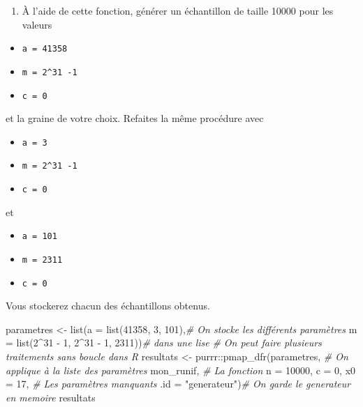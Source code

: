 \documentclass[
]{article}
\newenvironment{Shaded}{\begin{snugshade}}{\end{snugshade}}
\newcommand{\AttributeTok}[1]{\textcolor[rgb]{0.77,0.63,0.00}{#1}}
\newcommand{\CommentTok}[1]{\textcolor[rgb]{0.56,0.35,0.01}{\textit{#1}}}
\newcommand{\DecValTok}[1]{\textcolor[rgb]{0.00,0.00,0.81}{#1}}
\newcommand{\FunctionTok}[1]{\textcolor[rgb]{0.00,0.00,0.00}{#1}}
\newcommand{\NormalTok}[1]{#1}
\newcommand{\OtherTok}[1]{\textcolor[rgb]{0.56,0.35,0.01}{#1}}
\newcommand{\SpecialCharTok}[1]{\textcolor[rgb]{0.00,0.00,0.00}{#1}}
\newcommand{\StringTok}[1]{\textcolor[rgb]{0.31,0.60,0.02}{#1}}
\providecommand{\tightlist}{%
  \setlength{\itemsep}{0pt}\setlength{\parskip}{0pt}}
\begin{document}
\begin{enumerate}
\def\labelenumi{\arabic{enumi}.}
\setcounter{enumi}{1}
\tightlist
\item
  À l'aide de cette fonction, générer un échantillon de taille 10000
  pour les valeurs
\end{enumerate}

\begin{itemize}
\tightlist
\item
  \texttt{a\ =\ 41358}
\item
  \texttt{m\ =\ 2\^{}31\ -1}
\item
  \texttt{c\ =\ 0}
\end{itemize}

et la graine de votre choix. Refaites la même procédure avec

\begin{itemize}
\tightlist
\item
  \texttt{a\ =\ 3}
\item
  \texttt{m\ =\ 2\^{}31\ -1}
\item
  \texttt{c\ =\ 0}
\end{itemize}

et

\begin{itemize}
\tightlist
\item
  \texttt{a\ =\ 101}
\item
  \texttt{m\ =\ 2311}
\item
  \texttt{c\ =\ 0}
\end{itemize}

Vous stockerez chacun des échantillons obtenus.

\begin{Shaded}
\begin{Highlighting}[]
\NormalTok{parametres }\OtherTok{\textless{}{-}} \FunctionTok{list}\NormalTok{(}\AttributeTok{a =} \FunctionTok{list}\NormalTok{(}\DecValTok{41358}\NormalTok{, }\DecValTok{3}\NormalTok{, }\DecValTok{101}\NormalTok{),}\CommentTok{\# On stocke les différents paramètres}
                   \AttributeTok{m =} \FunctionTok{list}\NormalTok{(}\DecValTok{2}\SpecialCharTok{\^{}}\DecValTok{31} \SpecialCharTok{{-}} \DecValTok{1}\NormalTok{, }\DecValTok{2}\SpecialCharTok{\^{}}\DecValTok{31} \SpecialCharTok{{-}} \DecValTok{1}\NormalTok{, }\DecValTok{2311}\NormalTok{))}\CommentTok{\# dans une lise}
\CommentTok{\# On peut faire plusieurs traitements sans boucle dans R}
\NormalTok{resultats }\OtherTok{\textless{}{-}}\NormalTok{ purrr}\SpecialCharTok{::}\FunctionTok{pmap\_dfr}\NormalTok{(parametres, }\CommentTok{\# On applique à la liste des paramètres}
\NormalTok{                             mon\_runif, }\CommentTok{\# La fonction}
                             \AttributeTok{n =} \DecValTok{10000}\NormalTok{, }\AttributeTok{c =} \DecValTok{0}\NormalTok{, }\AttributeTok{x0 =} \DecValTok{17}\NormalTok{, }\CommentTok{\# Les paramètres manquants}
                             \AttributeTok{.id =} \StringTok{"generateur"}\NormalTok{)}\CommentTok{\# On garde le generateur en memoire}
\NormalTok{resultats}
\end{Highlighting}
\end{Shaded}
\end{document}
